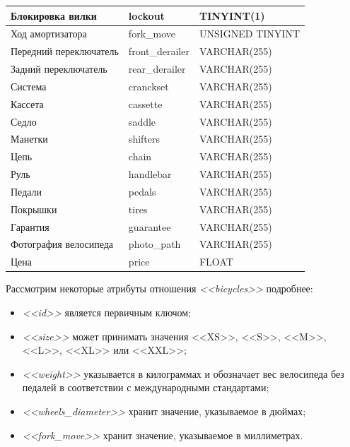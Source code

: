 \begin{table}[h!]
{\begin{tabular}{| p{} | p{} | p{} |}
      \hline
      Блокировка вилки & lockout & TINYINT(1) \\

      \hline
      Ход амортизатора & fork\_move & UNSIGNED TINYINT \\

      \hline
      Передний переключатель & front\_derailer & VARCHAR(255) \\

      \hline
      Задний переключатель & rear\_derailer & VARCHAR(255) \\

      \hline
      Система & cranckset & VARCHAR(255) \\

      \hline
      Кассета & cassette & VARCHAR(255) \\

      \hline
      Седло & saddle & VARCHAR(255) \\

      \hline
      Манетки & shifters & VARCHAR(255) \\

      \hline
      Цепь & chain & VARCHAR(255) \\

      \hline
      Руль & handlebar & VARCHAR(255) \\

      \hline
      Педали & pedals & VARCHAR(255) \\

      \hline
      Покрышки & tires & VARCHAR(255) \\

      \hline
      Гарантия & guarantee & VARCHAR(255) \\

      \hline
      Фотография велосипеда & photo\_path & VARCHAR(255) \\

      \hline
      Цена & price & FLOAT \\

      \hline
    \end{tabular}
  }
\end{table}

Рассмотрим некоторые атрибуты отношения \textit{<<bicycles>>} подробнее:
\begin{itemize}
  \item \textit{<<id>>} является первичным ключом;
  \item \textit{<<size>>} может принимать значения <<XS>>, <<S>>, <<M>>, <<L>>, <<XL>> или <<XXL>>;
  \item \textit{<<weight>>} указывается в килограммах и обозначает вес велосипеда
    без педалей в соответствии с международными стандартами;
  \item \textit{<<wheels\_diameter>>} хранит значение, указываемое в дюймах;
  \item \textit{<<fork\_move>>} хранит значение, указываемое в миллиметрах.
\end{itemize}

